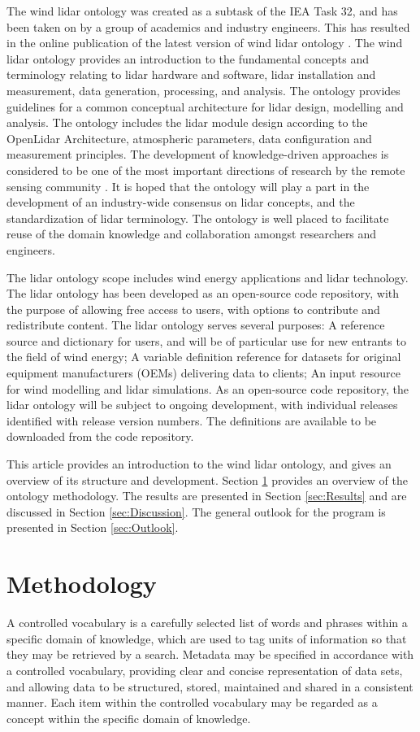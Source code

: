 \documentclass[remotesensing,article,submit,pdftex,moreauthors]{Definitions/mdpi}
\begin{document}
The wind lidar ontology \cite{ref-Clifton-Costa} was created as a subtask of the IEA Task 32, and has been taken on by a group of academics and industry engineers.
This has resulted in the online publication of the latest version of wind lidar ontology \cite{ref-OntoWeb}.
The wind lidar ontology provides an introduction to the fundamental concepts and terminology relating to lidar hardware and software, lidar installation and measurement, data generation, processing, and analysis.
The ontology provides guidelines for a common conceptual architecture for lidar design, modelling and analysis.
The ontology includes the lidar module design according to the OpenLidar Architecture, atmospheric parameters, data configuration and measurement principles.
The development of knowledge-driven approaches is considered to be one of the most important directions of research by the remote sensing community \cite{ref-Arvor_2019}.
It is hoped that the ontology will play a part in the development of an industry-wide consensus on lidar concepts, and the standardization of lidar terminology.
The ontology is well placed to facilitate reuse of the domain knowledge and collaboration amongst researchers and engineers.

The lidar ontology scope includes wind energy applications and lidar technology.
The lidar ontology has been developed as an open-source code repository, with the purpose of allowing
free access to users, with options to contribute and redistribute content.
The lidar ontology serves several purposes: A reference source and dictionary for users, and will be of particular
use for new entrants to the field of wind energy;
A variable definition reference for datasets for original equipment manufacturers (OEMs) delivering data to clients;
An input resource for wind modelling and lidar simulations.
As an open-source code repository, the lidar ontology will be subject to ongoing development, with individual releases identified with release version numbers.
The definitions are available to be downloaded from the code repository.

This article provides an introduction to the wind lidar ontology, and gives an overview of its structure and development. Section \ref{sec:Methodology} provides an overview of the ontology methodology. The results are presented in Section \ref{sec:Results} and are discussed in Section \ref{sec:Discussion}. The general outlook for the program is presented in Section \ref{sec:Outlook}.


\section{Methodology}
\label{sec:Methodology}
A controlled vocabulary is a carefully selected list of words and phrases within a specific domain of knowledge, which are used to tag units of information so that they may be retrieved by a search.
Metadata may be specified in accordance with a controlled vocabulary, providing clear and concise representation of data sets, and allowing data to be structured, stored, maintained and shared in a consistent manner. 
Each item within the controlled vocabulary may be regarded as a concept within the specific domain of knowledge.
\end{document}
